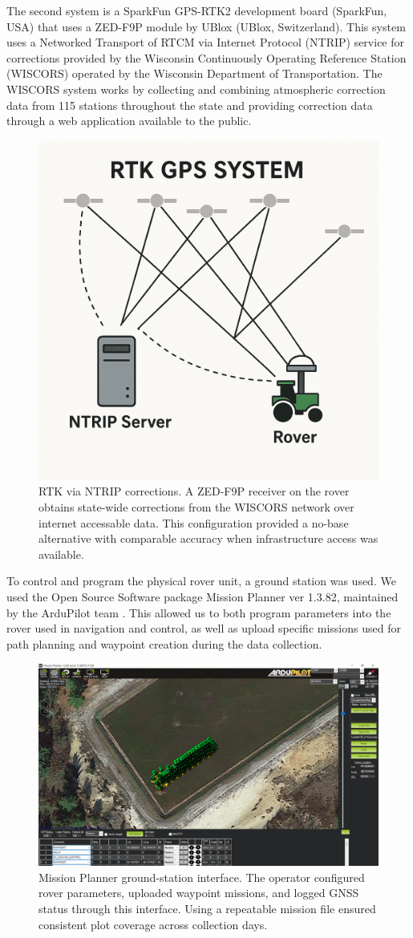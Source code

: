 The second system is a SparkFun GPS-RTK2 development board (SparkFun, USA) that uses a ZED-F9P module by UBlox (UBlox, Switzerland). This system uses a Networked Transport of RTCM via Internet Protocol (NTRIP) service for corrections provided by the Wisconsin Continuously Operating Reference Station (WISCORS) operated by the Wisconsin Department of Transportation. The WISCORS system works by collecting and combining atmospheric correction data from 115 stations throughout the state and providing correction data through a web application available to the public\cite{wisconsin_department_of_transportation_wiscors_nodate}. 

\begin{figure}[!ht]
    \centering
    \includegraphics[width=0.5\linewidth]{images/Ntrip.png}
    \caption{RTK via NTRIP corrections. A ZED-F9P receiver on the rover obtains state-wide corrections from the WISCORS network over internet accessable data. This configuration provided a no-base alternative with comparable accuracy when infrastructure access was available.}
    \label{fig:NTRIP RTK}
\end{figure}

To control and program the physical rover unit, a ground station was used. We used the Open Source Software package Mission Planner ver 1.3.82, maintained by the ArduPilot team \cite{ardupilot_mission_nodate}. This allowed us to both program parameters into the rover used in navigation and control, as well as upload specific missions used for path planning and waypoint creation during the data collection.

\begin{figure}[!ht]
    \centering
    \includegraphics[width=0.5\linewidth]{images/Mission Planner.png}
    \caption{Mission Planner ground-station interface. The operator configured rover parameters, uploaded waypoint missions, and logged GNSS status through this interface. Using a repeatable mission file ensured consistent plot coverage across collection days.}
    \label{fig:Mission Planner}
\end{figure}

